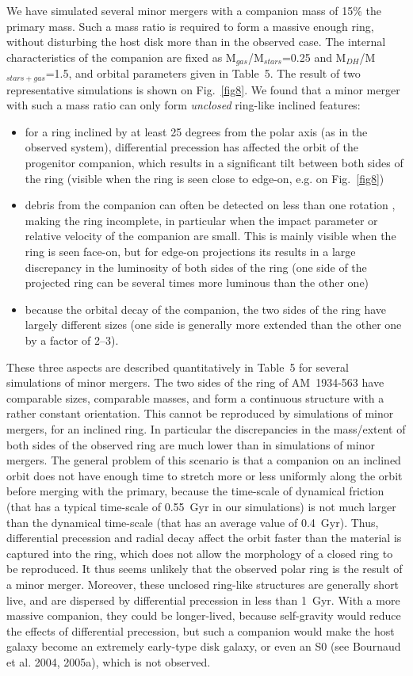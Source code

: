 \documentclass[]{aa}
\begin{document}
We have simulated several minor mergers with a companion mass of 15\% the primary 
mass. Such a mass ratio is required to form a massive enough ring, without disturbing 
the host disk more than in the observed case. The internal characteristics of the 
companion are fixed as M$_{gas}$/M$_{stars}$=0.25 and M$_{DH}$/M$_{stars+gas}$=1.5, 
and orbital parameters given in Table~5. The result of two representative simulations 
is shown on Fig.~\ref{fig8}. We found that a minor merger with such a mass ratio 
can only form {\it unclosed} ring-like inclined features:
\begin{itemize}
\item for a ring inclined by at least 25 degrees from the polar axis (as in the observed 
system), differential precession has affected the orbit of the progenitor companion, 
which results in a significant tilt between both sides of the ring (visible when the ring 
is seen close to edge-on, e.g. on Fig.~\ref{fig8})
\item debris from the companion can often be detected on less than one rotation , making 
the ring incomplete, in particular when the impact parameter or relative velocity of 
the companion are small. This is mainly visible when the ring is seen face-on, but for 
edge-on projections its results in a large discrepancy in the luminosity of both sides 
of the ring (one side of the projected ring can be several times more luminous 
than the other one)
\item because the orbital decay of the companion, the two sides of the ring have 
largely different sizes (one side is generally more extended than the other one by a 
factor of 2--3).
\end{itemize}
These three aspects are described quantitatively in Table~5 for several simulations of 
minor mergers. The two sides of the ring of AM~1934-563 have comparable sizes, 
comparable masses, and form a continuous structure with a rather constant orientation. 
This cannot be reproduced by simulations of minor mergers, for an inclined ring. 
In particular the discrepancies in the mass/extent of both sides of the observed 
ring are much lower than in simulations of minor mergers. The general problem of 
this scenario is that a companion on an inclined orbit does not have enough 
time to stretch more or less uniformly along the orbit before merging with the primary, 
because the time-scale of dynamical  friction (that has a typical time-scale of 0.55~Gyr in 
our simulations) is not much larger than the dynamical time-scale (that has an average 
value of 0.4~Gyr). Thus, differential precession and radial decay affect the orbit faster 
than the material is captured into the ring, which does not allow the morphology of 
a closed ring to be reproduced. It thus seems unlikely that the observed polar ring 
is the result of a minor merger. Moreover, these unclosed ring-like structures are 
generally short live, and are dispersed by differential precession in less than 1~Gyr. 
With a more massive companion, they could be longer-lived, because self-gravity 
would reduce the effects of differential precession, but such a companion would make 
the host galaxy become an extremely early-type disk galaxy, or even an S0 
(see Bournaud et al. 2004, 2005a), which is not observed. 
\end{document}
